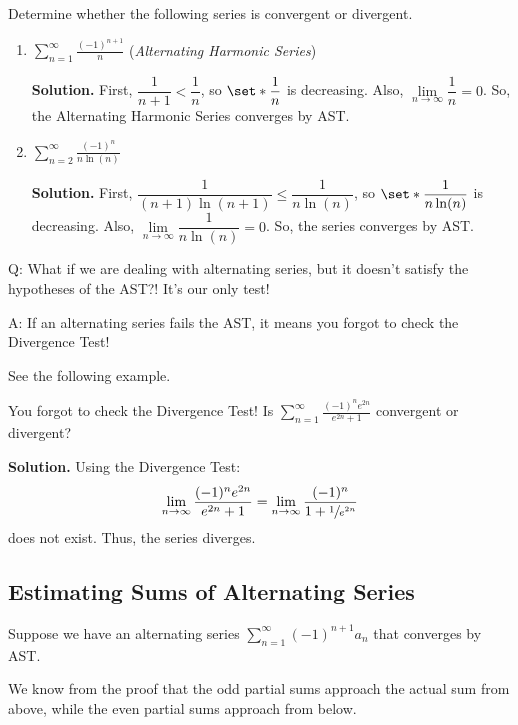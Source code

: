 \begin{Example}{}{}
    Determine whether the following series is convergent or divergent.
    \begin{enumerate}[label=(\roman*)]
        \item $ \displaystyle  \sum\limits_{n=1}^{\infty} \frac{(-1)^{n+1}}{n} $
              (\emph{Alternating Harmonic Series})

              \textbf{Solution.} First, $ \dfrac{1}{n+1}<\dfrac{1}{n} $,
              so $ \set*{\dfrac{1}{n}} $ is decreasing. Also,
              $ \lim\limits_{{n} \to {\infty}} \dfrac{1}{n}=0 $. So,
              the Alternating Harmonic Series converges by AST\@.
        \item $ \displaystyle \sum\limits_{n=2}^{\infty} \frac{(-1)^n}{n\ln(n)} $

              \textbf{Solution.}
              First, $ \dfrac{1}{(n+1)\ln(n+1)}\leqslant \dfrac{1}{n\ln(n)} $,
              so $ \set*{\dfrac{1}{n\ln(n)}} $ is decreasing. Also,
              $ \lim\limits_{{n} \to {\infty}} \dfrac{1}{n\ln(n)}=0 $. So,
              the series converges by AST\@.
    \end{enumerate}
\end{Example}
Q\@: What if we are dealing with alternating series, but it doesn't satisfy
the hypotheses of the AST?! It's our only test!

A\@: If an alternating series fails the AST, it means you forgot to check the Divergence Test!

See the following example.
\begin{Example}{You forgot to check the Divergence Test!}{}
    Is
    $ \displaystyle  \sum\limits_{n=1}^{\infty} \frac{(-1)^n e^{2n}}{e^{2n}+1} $
    convergent or divergent?

    \textbf{Solution.}
    Using the Divergence Test:
    \[ \lim\limits_{{n} \to {\infty}} \frac{(-1)^n e^{2n}}{e^{2n}+1}=
        \lim\limits_{{n} \to {\infty}} \frac{(-1)^n}{1+\sfrac{1}{e^{2n}}} \]
    does not exist. Thus, the series diverges.
\end{Example}

\subsection*{Estimating Sums of Alternating Series}
Suppose we have an alternating series $ \sum\limits_{n=1}^{\infty} (-1)^{n+1}a_n $
that converges by AST\@.

We know from the proof that the odd partial sums approach the actual sum from above,
while the even partial sums approach from below.

